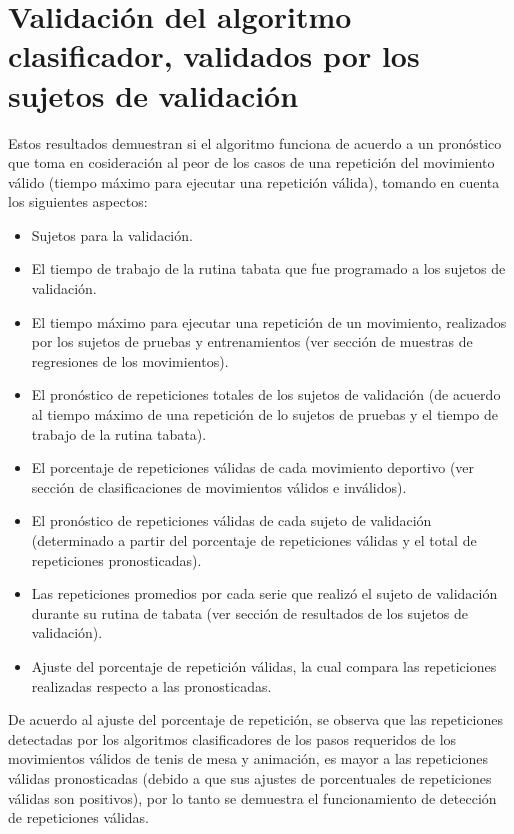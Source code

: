 \section{Validaci\'on del algoritmo clasificador,   validados por los sujetos de validaci\'on} \label{res:valResults}
Estos resultados demuestran si el algoritmo funciona de acuerdo a un pron\'ostico que toma en cosideraci\'on al peor de los casos de una repetici\'on del movimiento v\'alido (tiempo m\'aximo para ejecutar una repetici\'on v\'alida), tomando en cuenta los siguientes aspectos:
\begin{itemize}
\item Sujetos para la validaci\'on.
\item El tiempo de trabajo de la rutina tabata que fue programado a los sujetos de validaci\'on.
\item El tiempo m\'aximo para ejecutar una repetici\'on de un movimiento, realizados por los sujetos de pruebas y entrenamientos (ver secci\'on de muestras de regresiones de los movimientos).
\item El pron\'ostico de repeticiones totales de los sujetos de validaci\'on (de acuerdo al tiempo m\'aximo de una repetici\'on de lo sujetos de pruebas y el tiempo de trabajo de la rutina tabata).
\item El porcentaje de repeticiones v\'alidas de cada movimiento deportivo (ver secci\'on de clasificaciones de movimientos v\'alidos e inv\'alidos).
\item El pron\'ostico de repeticiones v\'alidas de cada sujeto de validaci\'on (determinado a partir del porcentaje de repeticiones v\'alidas y el total de repeticiones pronosticadas).
\item Las repeticiones promedios por cada serie que realiz\'o el sujeto de validaci\'on durante su rutina de tabata (ver secci\'on de resultados de los sujetos de validaci\'on).
\item  Ajuste del porcentaje de repetici\'on v\'alidas, la cual compara las repeticiones realizadas respecto a las pronosticadas.
\end{itemize}
\medbreak
De acuerdo al ajuste del porcentaje de repetici\'on, se observa que las repeticiones detectadas por los algoritmos clasificadores de los pasos requeridos de los movimientos v\'alidos de tenis de mesa y animaci\'on, es mayor a las repeticiones v\'alidas pronosticadas (debido a que sus ajustes de porcentuales de repeticiones v\'alidas son positivos), por lo tanto se demuestra el funcionamiento de detecci\'on de repeticiones v\'alidas.
\medbreak
